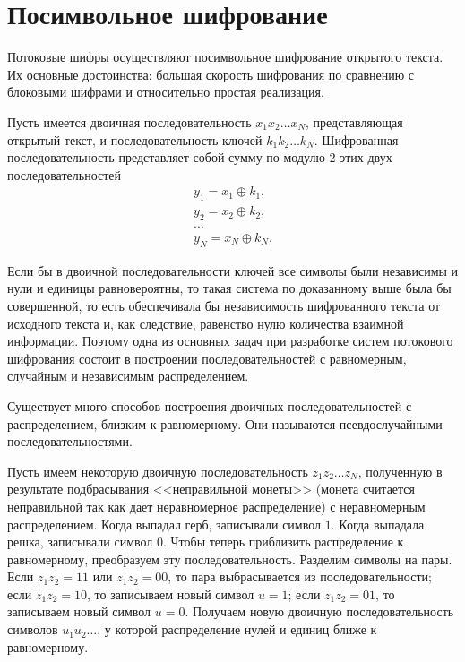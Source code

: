 \section{Посимвольное шифрование}

Потоковые шифры осуществляют посимвольное шифрование открытого текста. Их основные достоинства: большая скорость шифрования по сравнению с блоковыми шифрами и относительно простая реализация.

Пусть имеется двоичная последовательность $x_{1} x_{2} \dots x_{N}$, представляющая открытый текст, и последовательность ключей $k_{1} k_{2} \dots k_{N}$. Шифрованная последовательность представляет собой сумму по модулю 2 этих двух последовательностей
\[ \begin{array}{l}
    y_{1} = x_{1} \oplus k_{1}, \\
    y_{2} = x_{2} \oplus k_{2}, \\
    \dots \\
    y_{N} = x_{N} \oplus k_{N}.
\end{array} \]

Если бы в двоичной последовательности ключей все символы были независимы и нули и единицы равновероятны, то такая система по доказанному выше была бы совершенной, то есть обеспечивала бы независимость шифрованного текста от исходного текста и, как следствие, равенство нулю количества взаимной информации. Поэтому одна из основных задач при разработке систем потокового шифрования состоит в построении последовательностей с равномерным, случайным и независимым распределением.

Существует много способов построения двоичных последовательностей с распределением, близким к равномерному. Они называются псевдослучайными последовательностями.

Пусть имеем некоторую двоичную последовательность $z_{1} z_{2} \ldots z_{N}$, полученную в результате подбрасывания <<неправильной монеты>> (монета считается неправильной так как дает неравномерное распределение) с неравномерным распределением. Когда выпадал герб, записывали символ $1$. Когда выпадала решка, записывали символ $0$. Чтобы теперь приблизить распределение к равномерному, преобразуем эту последовательность. Разделим символы на пары. Если $z_{1} z_{2} = 11$ или $z_{1} z_{2} = 00$, то пара выбрасывается из последовательности; если $z_{1} z_{2} =10$, то записываем новый символ $u=1$; если $z_{1} z_{2} =01$, то записываем новый символ $u=0$. Получаем новую двоичную последовательность символов $u_{1}u_{2}\ldots $, у которой распределение нулей и единиц ближе к равномерному.
